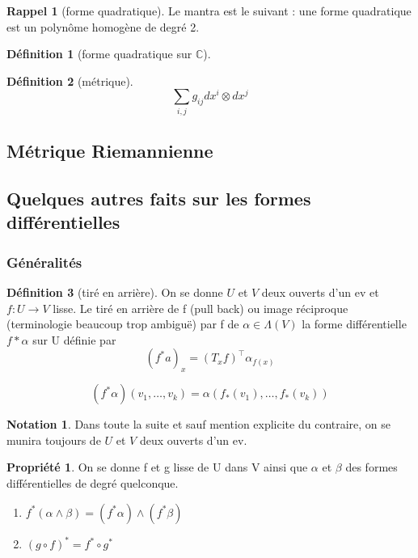 \documentclass{article}
\newcommand{\C}{\mathbb{C}} %
\theoremstyle{definition} %
\newtheorem{defi}{Définition}
\newtheorem{rap}{Rappel}
\newtheorem{nota}{Notation}
\newtheorem{propri}{Propriété}
\newcommand{\1}{\mathbb{1}} %
\begin{document}
\begin{rap}[forme quadratique]
Le mantra est le suivant : une forme quadratique est un polynôme homogène de degré 2.
\end{rap}

\begin{defi}[forme quadratique sur $\C$]
    
\end{defi}

\begin{defi}[métrique]
$$\sum_{i,j} g_{ij}dx^i\otimes dx^j$$
\end{defi}

\subsection{Métrique Riemannienne}

\subsection{Quelques autres faits sur les formes différentielles}

\subsubsection{Généralités}

\begin{defi}[tiré en arrière]
On se donne $U$ et $V$ deux ouverts d'un ev et $f: U \to V$ lisse.
Le tiré en arrière de f (pull back) ou image réciproque (terminologie beaucoup trop ambiguë) par f de $\alpha \in \Lambda(V)$ la forme différentielle $f*\alpha$ sur U définie par
$$(f^*a)_x = (T_x f)^\intercal \alpha_{f(x)}$$

$$
(f^*\alpha)(v_1,\ldots,v_k)=\alpha(f_*(v_1),\ldots,f_*(v_k))
$$

\end{defi}

\begin{nota}
Dans toute la suite et sauf mention explicite du contraire, on se munira toujours de $U$ et $V$ deux ouverts d'un ev.
\end{nota}

\begin{propri}
On se donne f et g lisse de U dans V ainsi que $\alpha $ et $\beta$ des formes différentielles de degré quelconque.
\begin{enumerate}
\item $f^*(\alpha \wedge \beta) = (f^*\alpha) \wedge (f^*\beta)$
\item $(g \circ f)^*= f^* \circ g^*$
\end{enumerate} 
\end{propri}
\end{document}
